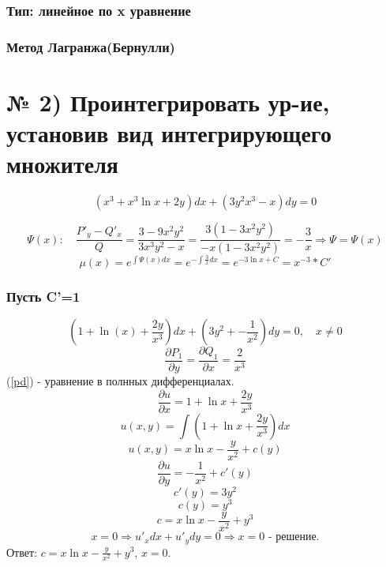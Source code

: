 \documentclass[a4paper]{article}
\begin{document}
\subsubsection*{Тип: линейное по x уравнение }

\subsubsection*{Метод Лагранжа(Бернулли)}

\section*{№ 2) Проинтегрировать ур-ие, установив вид интегрирующего множителя}
\begin{equation*}
(x^3+x^3\ln{x}+2y)dx+(3y^2x^3-x)dy=0
\end{equation*}

\begin{equation*}
\Psi(x): \quad \frac{P'_y-Q'_x}{Q}=
\frac{3-9x^2y^2}{3x^3y^2-x}=
\frac{3(1-3x^2y^2)}{-x(1-3x^2y^2)}=-\frac{3}{x}
\Rightarrow \Psi=\Psi(x)
\end{equation*}
\begin{equation*}
\mu(x)=e^{\int\Psi(x)dx}=e^{-\int\frac{3}{x}dx}=e^{-3\ln x + C}=x^{-3}*C'
\end{equation*}

\subsubsection*{Пусть C'=1}

\begin{equation}
\left(1+\ln(x)+\frac{2y}{x^3}\right)dx+\left(3y^2+-\frac{1}{x^2}\right)dy=0 \label{pd},\quad x\neq0
\end{equation}
\begin{equation*}
\frac{\partial P_1}{\partial y}=\frac{\partial Q_1}{\partial x}=\frac{2}{x^3}
\end{equation*}
(\ref{pd}) - уравнение в полнных дифференциалах.
\begin{equation*}
\frac{\partial u}{\partial x} = 1+\ln x+\frac{2y}{x^3}
\end{equation*}
\begin{equation*}
u(x,y)= \int \left(1+\ln x+\frac{2y}{x^3}\right)dx
\end{equation*}
\begin{equation*}
u(x,y)= x\ln x-\frac{y}{x^2}+c(y)
\end{equation*}
\begin{equation*}
\frac{\partial u}{\partial y} = -\frac{1}{x^2}+c'(y)
\end{equation*}
\begin{equation*}
c'(y)=3y^2
\end{equation*}
\begin{equation*}
c(y)=y^3
\end{equation*}
\begin{equation*}
c=x\ln x-\frac{y}{x^2}+y^3
\end{equation*}
\begin{equation*}
x=0 \Rightarrow u'_xdx+u'_ydy=0 \Rightarrow x=0\text{ - решение.}
\end{equation*}
Ответ: $c=x\ln x-\frac{y}{x^2}+y^3$,
$x=0$.
\end{document}
